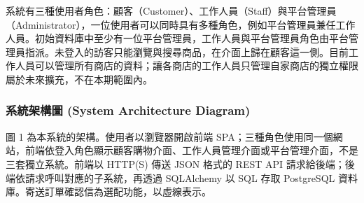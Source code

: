 \documentclass[12pt,a4paper]{article}
\begin{document}
系統有三種使用者角色：顧客（Customer）、工作人員（Staff）與平台管理員（Administrator），一位使用者可以同時具有多種角色，例如平台管理員兼任工作人員。初始資料庫中至少有一位平台管理員，工作人員與平台管理員角色由平台管理員指派。未登入的訪客只能瀏覽與搜尋商品，在介面上歸在顧客這一側。目前工作人員可以管理所有商店的資料；讓各商店的工作人員只管理自家商店的獨立權限屬於未來擴充，不在本期範圍內。

\subsubsection{系統架構圖 (System Architecture Diagram)}
圖 1 為本系統的架構。使用者以瀏覽器開啟前端 SPA；三種角色使用同一個網站，前端依登入角色顯示顧客購物介面、工作人員管理介面或平台管理介面，不是三套獨立系統。前端以 HTTP(S) 傳送 JSON 格式的 REST API 請求給後端；後端依請求呼叫對應的子系統，再透過 SQLAlchemy 以 SQL 存取 PostgreSQL 資料庫。寄送訂單確認信為選配功能，以虛線表示。
\end{document}
